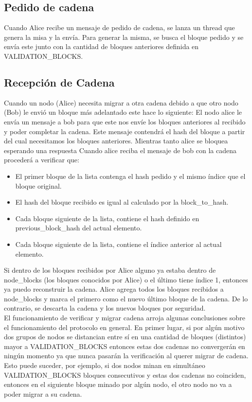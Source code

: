 \subsection{Pedido de cadena}
Cuando Alice recibe un mensaje de pedido de cadena, se lanza un thread que genera la misa y la envía. Para generar la misma, se busca el bloque pedido y se envía este junto con la cantidad de bloques anteriores definida en VALIDATION_BLOCKS.

\subsection{Recepción de Cadena}

Cuando un nodo (Alice) necesita migrar a otra cadena debido a que otro nodo (Bob) le envió un bloque más adelantado este hace lo siguiente:
El nodo alice le envía un mensaje a bob para que este nos envíe los
bloques anteriores al recibido y poder completar la cadena. Este mensaje contendrá el hash del bloque a partir del cual necesitamos los bloques anteriores. Mientras tanto alice se bloquea esperando una respuesta
Cuando alice reciba el mensaje de bob con la cadena procederá a verificar que:

\begin{itemize}
    \item El primer bloque de la lista contenga el hash pedido y el mismo índice que el bloque original.
    \item El hash del bloque recibido es igual al calculado por la block_to_hash.
    \item Cada bloque siguiente de la lista, contiene el hash definido en previous_block_hash del actual elemento.
    \item Cada bloque siguiente de la lista, contiene el índice anterior al actual elemento.
\end{itemize}

Si dentro de los bloques recibidos por Alice alguno ya estaba dentro de node_blocks (los bloques conocidos por Alice) o el último tiene índice 1, entonces ya puedo reconstruir la cadena. Alice agrega todos los bloques recibidos a node_blocks y marca el primero como el nuevo último bloque de la cadena. De lo contrario, se descarta la cadena y los nuevos bloques por seguridad.\\

El funcionamiento de verificar y migrar cadena arroja algunas conclusiones sobre el funcionamiento del protocolo en general. En primer lugar, si por algún motivo dos grupos de nodos se distancian entre sí en una cantidad de bloques (distintos) mayor a VALIDATION_BLOCKS entonces estas dos cadenas no convergerán en ningún momento ya que nunca pasarán la verificación al querer migrar de cadena. Esto puede suceder, por ejemplo, si dos nodos minan en simultáneo VALIDATION_BLOCKS bloques consecutivos y estas dos cadenas no coinciden, entonces en el siguiente bloque minado por algún nodo, el otro nodo no va a poder migrar a su cadena.\\

